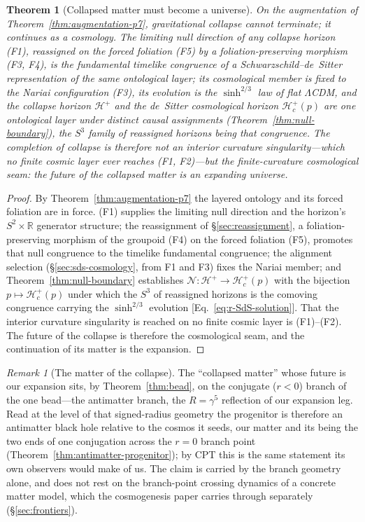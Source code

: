 \documentclass[11pt,a4paper]{article}
\theoremstyle{plain}
\newtheorem{theorem}{Theorem}
\theoremstyle{definition}
\theoremstyle{remark}
\newtheorem{remark}{Remark}
\begin{document}
\begin{theorem}[Collapsed matter must become a universe]\label{thm:cosmogenesis}
On the augmentation of Theorem~\ref{thm:augmentation-p7}, gravitational collapse cannot terminate; it continues as a cosmology. The limiting null direction of any collapse horizon \textup{(F1)}, reassigned on the forced foliation \textup{(F5)} by a foliation-preserving morphism \textup{(F3, F4)}, is the fundamental timelike congruence of a Schwarzschild--de~Sitter representation of the same ontological layer; its cosmological member is fixed to the Nariai configuration \textup{(F3)}, its evolution is the $\sinh^{2/3}$ law of flat $\Lambda$CDM, and the collapse horizon $\mathcal{H}^+$ and the de~Sitter cosmological horizon $\mathcal{H}_c^{+}(p)$ are one ontological layer under distinct causal assignments \textup{(Theorem~\ref{thm:null-boundary})}, the $S^3$ family of reassigned horizons being that congruence. The completion of collapse is therefore not an interior curvature singularity---which no finite cosmic layer ever reaches \textup{(F1, F2)}---but the finite-curvature cosmological seam: the future of the collapsed matter \emph{is} an expanding universe.
\end{theorem}

\begin{proof}
By Theorem~\ref{thm:augmentation-p7} the layered ontology and its forced foliation are in force. (F1) supplies the limiting null direction and the horizon's $S^2\times\mathbb{R}$ generator structure; the reassignment of \S\ref{sec:reassignment}, a foliation-preserving morphism of the groupoid (F4) on the forced foliation (F5), promotes that null congruence to the timelike fundamental congruence; the alignment selection (\S\ref{sec:sds-cosmology}, from F1 and F3) fixes the Nariai member; and Theorem~\ref{thm:null-boundary} establishes $\mathcal{N}:\mathcal{H}^+\to\mathcal{H}_c^{+}(p)$ with the bijection $p\mapsto\mathcal{H}_c^{+}(p)$ under which the $S^3$ of reassigned horizons is the comoving congruence carrying the $\sinh^{2/3}$ evolution [Eq.~\eqref{eq:r-SdS-solution}]. That the interior curvature singularity is reached on no finite cosmic layer is (F1)--(F2). The future of the collapse is therefore the cosmological seam, and the continuation of its matter is the expansion.
\end{proof}

\begin{remark}[The matter of the collapse]
The ``collapsed matter'' whose future is our expansion sits, by Theorem~\ref{thm:bead}, on the conjugate ($r<0$) branch of the one bead---the antimatter branch, the $R=\gamma^5$ reflection of our expansion leg. Read at the level of that signed-radius geometry the progenitor is therefore an antimatter black hole relative to the cosmos it seeds, our matter and its being the two ends of one conjugation across the $r=0$ branch point (Theorem~\ref{thm:antimatter-progenitor}); by CPT this is the same statement its own observers would make of us. The claim is carried by the branch geometry alone, and does not rest on the branch-point crossing dynamics of a concrete matter model, which the cosmogenesis paper carries through separately (\S\ref{sec:frontiers}).
\end{remark}
\end{document}
